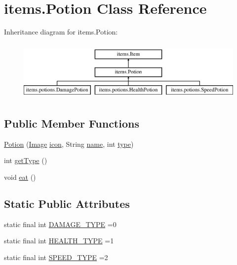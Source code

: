 \hypertarget{classitems_1_1_potion}{}\section{items.\+Potion Class Reference}
\label{classitems_1_1_potion}
Inheritance diagram for items.\+Potion\+:\begin{figure}[H]
\begin{center}
\leavevmode
\includegraphics[height=3.000000cm]{classitems_1_1_potion}
\end{center}
\end{figure}
\subsection*{Public Member Functions}
\begin{DoxyCompactItemize}
\item 
\mbox{\hyperlink{classitems_1_1_potion_ab2a46630762ff8d852c72333029252e5}{Potion}} (\mbox{\hyperlink{classorg_1_1newdawn_1_1slick_1_1_image}{Image}} \mbox{\hyperlink{classitems_1_1_item_afa445ad011d48c3455b0c04bec2581f9}{icon}}, String \mbox{\hyperlink{classitems_1_1_item_a086327df1ba046bbbe3fa2f753226d73}{name}}, int \mbox{\hyperlink{classitems_1_1_potion_a9f9bc89fd8dfdadc0fa0101b725c524e}{type}})
\item 
int \mbox{\hyperlink{classitems_1_1_potion_a6c04f56c990c3782b5786252bb73545e}{get\+Type}} ()
\item 
void \mbox{\hyperlink{classitems_1_1_potion_a33ab3390826ef43ddfa94fc812e53afe}{eat}} ()
\end{DoxyCompactItemize}
\subsection*{Static Public Attributes}
\begin{DoxyCompactItemize}
\item 
static final int \mbox{\hyperlink{classitems_1_1_potion_ac52a6d60f2a804077f3850d4e3d18134}{D\+A\+M\+A\+G\+E\+\_\+\+T\+Y\+PE}} =0
\item 
static final int \mbox{\hyperlink{classitems_1_1_potion_ad061a8ede39b64c807666a1bdab25ad8}{H\+E\+A\+L\+T\+H\+\_\+\+T\+Y\+PE}} =1
\item 
static final int \mbox{\hyperlink{classitems_1_1_potion_a619c80930d2ccb61d07ed13da3ee475b}{S\+P\+E\+E\+D\+\_\+\+T\+Y\+PE}} =2
\end{DoxyCompactItemize}
